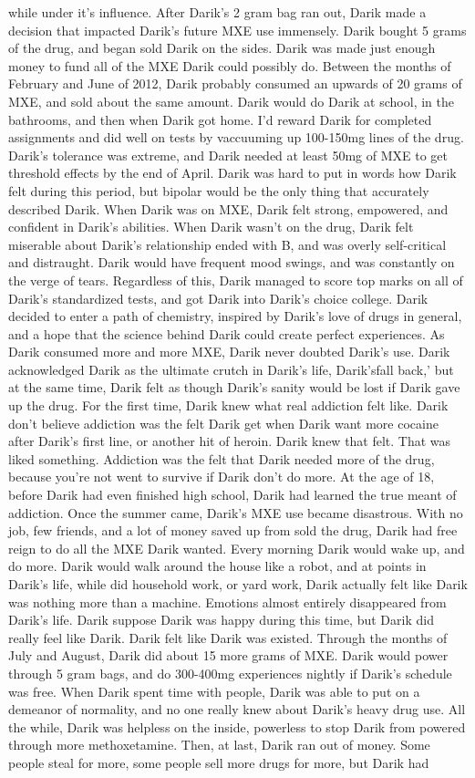 \documentclass[12pt]{book}
\begin{document}
while under it's influence. After Darik's 2 gram bag ran out, Darik made a decision that impacted Darik's future MXE use immensely. Darik bought 5 grams of the drug, and began sold Darik on the sides. Darik was made just enough money to fund all of the MXE Darik could possibly do. Between the months of February and June of 2012, Darik probably consumed an upwards of 20 grams of MXE, and sold about the same amount. Darik would do Darik at school, in the bathrooms, and then when Darik got home. I'd reward Darik for completed assignments and did well on tests by vaccuuming up 100-150mg lines of the drug. Darik's tolerance was extreme, and Darik needed at least 50mg of MXE to get threshold effects by the end of April. Darik was hard to put in words how Darik felt during this period, but bipolar would be the only thing that accurately described Darik. When Darik was on MXE, Darik felt strong, empowered, and confident in Darik's abilities. When Darik wasn't on the drug, Darik felt miserable about Darik's relationship ended with B, and was overly self-critical and distraught. Darik would have frequent mood swings, and was constantly on the verge of tears. Regardless of this, Darik managed to score top marks on all of Darik's standardized tests, and got Darik into Darik's choice college. Darik decided to enter a path of chemistry, inspired by Darik's love of drugs in general, and a hope that the science behind Darik could create perfect experiences. As Darik consumed more and more MXE, Darik never doubted Darik's use. Darik acknowledged Darik as the ultimate crutch in Darik's life, Darik'sfall back,' but at the same time, Darik felt as though Darik's sanity would be lost if Darik gave up the drug. For the first time, Darik knew what real addiction felt like. Darik don't believe addiction was the felt Darik get when Darik want more cocaine after Darik's first line, or another hit of heroin. Darik knew that felt. That was liked something. Addiction was the felt that Darik needed more of the drug, because you're not went to survive if Darik don't do more. At the age of 18, before Darik had even finished high school, Darik had learned the true meant of addiction. Once the summer came, Darik's MXE use became disastrous. With no job, few friends, and a lot of money saved up from sold the drug, Darik had free reign to do all the MXE Darik wanted. Every morning Darik would wake up, and do more. Darik would walk around the house like a robot, and at points in Darik's life, while did household work, or yard work, Darik actually felt like Darik was nothing more than a machine. Emotions almost entirely disappeared from Darik's life. Darik suppose Darik was happy during this time, but Darik did really feel like Darik. Darik felt like Darik was existed. Through the months of July and August, Darik did about 15 more grams of MXE. Darik would power through 5 gram bags, and do 300-400mg experiences nightly if Darik's schedule was free. When Darik spent time with people, Darik was able to put on a demeanor of normality, and no one really knew about Darik's heavy drug use. All the while, Darik was helpless on the inside, powerless to stop Darik from powered through more methoxetamine. Then, at last, Darik ran out of money. Some people steal for more, some people sell more drugs for more, but Darik had 
\end{document}
